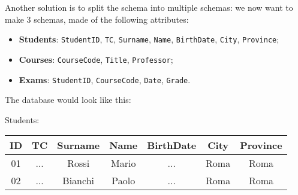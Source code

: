 Another solution is to split the schema into multiple schemas: we now want to make 3 schemas, made of the following attributes:
\begin{itemize}
    \item \textbf{Students}: \texttt{StudentID}, \texttt{TC}, \texttt{Surname}, \texttt{Name}, \texttt{BirthDate}, \texttt{City}, \texttt{Province};
    \item \textbf{Courses}: \texttt{CourseCode}, \texttt{Title}, \texttt{Professor};
    \item \textbf{Exams}: \texttt{StudentID}, \texttt{CourseCode}, \texttt{Date}, \texttt{Grade}.
\end{itemize}

The database would look like this:

\begin{center}
    Students: \quad \begin{tabular}{|c|c|c|c|c|c|c|}
        \hline \rowcolor{maindoccol!60}
        \textbf{ID} & \textbf{TC} & \textbf{Surname} & \textbf{Name} & \textbf{BirthDate} & \textbf{City} & \textbf{Province} \\
        \hline
        01 & ... & Rossi & Mario & ... & Roma & Roma \\
        \hline
        02 & ... & Bianchi & Paolo & ... & Roma & Roma \\
        \hline
    \end{tabular}
    \\
    \vspace{12pt}
\end{center}

